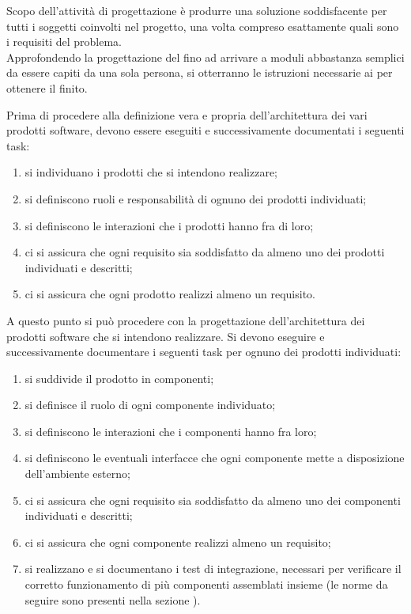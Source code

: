 		Scopo dell'attività di progettazione è produrre una soluzione soddisfacente per tutti i soggetti coinvolti nel progetto, una volta compreso esattamente quali sono i requisiti del problema. \\
		Approfondendo la progettazione del  fino ad arrivare a moduli abbastanza semplici da essere capiti da una sola persona, si otterranno le istruzioni necessarie ai  per ottenere il  finito.
			
			Prima di procedere alla definizione vera e propria dell'architettura dei vari prodotti software, devono essere eseguiti e successivamente documentati i seguenti task:
			\begin{enumerate}
				\item si individuano i prodotti che si intendono realizzare;
				\item si definiscono ruoli e responsabilità di ognuno dei prodotti individuati;
				\item si definiscono le interazioni che i prodotti hanno fra di loro;
				\item ci si assicura che ogni requisito sia soddisfatto da almeno uno dei prodotti individuati e descritti;
				\item ci si assicura che ogni prodotto realizzi almeno un requisito.
			\end{enumerate}
			A questo punto si può procedere con la progettazione dell'architettura dei prodotti software che si intendono realizzare. Si devono eseguire e successivamente documentare i seguenti task per ognuno dei prodotti individuati:
			\begin{enumerate}
				\item si suddivide il prodotto in componenti;
				\item si definisce il ruolo di ogni componente individuato;
				\item si definiscono le interazioni che i componenti hanno fra loro;
				\item si definiscono le eventuali interfacce che ogni componente mette a disposizione dell'ambiente esterno;
				\item ci si assicura che ogni requisito sia soddisfatto da almeno uno dei componenti individuati e descritti;
				\item ci si assicura che ogni componente realizzi almeno un requisito;
				\item si realizzano e si documentano i test di integrazione, necessari per verificare il corretto funzionamento di più componenti assemblati insieme (le norme da seguire sono presenti nella sezione ).
			\end{enumerate}
